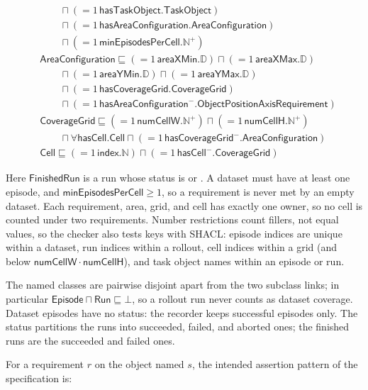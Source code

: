 \documentclass[11pt]{article}
\DeclareRobustCommand{\code}{\codeurl}  %
\begin{document}
\[\begin{aligned}
  &\qquad \sqcap ({=}1\,\mathsf{hasTaskObject}.\mathsf{TaskObject})\\
  &\qquad \sqcap ({=}1\,\mathsf{hasAreaConfiguration}.\mathsf{AreaConfiguration})\\
  &\qquad \sqcap ({=}1\,\mathsf{minEpisodesPerCell}.\mathbb{N}^{+})\\
&\mathsf{AreaConfiguration} \sqsubseteq ({=}1\,\mathsf{areaXMin}.\mathbb{D}) \sqcap ({=}1\,\mathsf{areaXMax}.\mathbb{D})\\
  &\qquad \sqcap ({=}1\,\mathsf{areaYMin}.\mathbb{D}) \sqcap ({=}1\,\mathsf{areaYMax}.\mathbb{D})\\
  &\qquad \sqcap ({=}1\,\mathsf{hasCoverageGrid}.\mathsf{CoverageGrid})\\
  &\qquad \sqcap ({=}1\,\mathsf{hasAreaConfiguration}^{-}.\mathsf{ObjectPositionAxisRequirement})\\
&\mathsf{CoverageGrid} \sqsubseteq ({=}1\,\mathsf{numCellW}.\mathbb{N}^{+}) \sqcap ({=}1\,\mathsf{numCellH}.\mathbb{N}^{+})\\
  &\qquad \sqcap \forall\mathsf{hasCell}.\mathsf{Cell} \sqcap ({=}1\,\mathsf{hasCoverageGrid}^{-}.\mathsf{AreaConfiguration})\\
&\mathsf{Cell} \sqsubseteq ({=}1\,\mathsf{index}.\mathbb{N}) \sqcap ({=}1\,\mathsf{hasCell}^{-}.\mathsf{CoverageGrid})
\end{aligned}
\]

Here \(\mathsf{FinishedRun}\) is a run whose status is \code{"succeeded"} or \code{"failed"}. A dataset must have
at least one episode, and \(\mathsf{minEpisodesPerCell}\geq 1\), so a requirement is never met by an empty dataset.
Each requirement, area, grid, and cell has exactly one owner, so no cell is counted under two requirements. Number
restrictions count fillers, not equal values, so the checker also tests keys with SHACL: episode indices are unique
within a dataset, run indices within a rollout, cell indices within a grid (and below
\(\mathsf{numCellW}\cdot\mathsf{numCellH}\)), and task object names within an episode or run.

The named classes are pairwise disjoint apart from the two subclass links; in particular
\(\mathsf{Episode}\sqcap\mathsf{Run}\sqsubseteq\bot\), so a rollout run never counts as dataset coverage. Dataset
episodes have no status: the recorder keeps successful episodes only. The status partitions the runs into
succeeded, failed, and aborted ones; the finished runs are the succeeded and failed ones.

For a requirement \(r\) on the object named \(s\), the intended assertion pattern
of the specification is:
\end{document}

